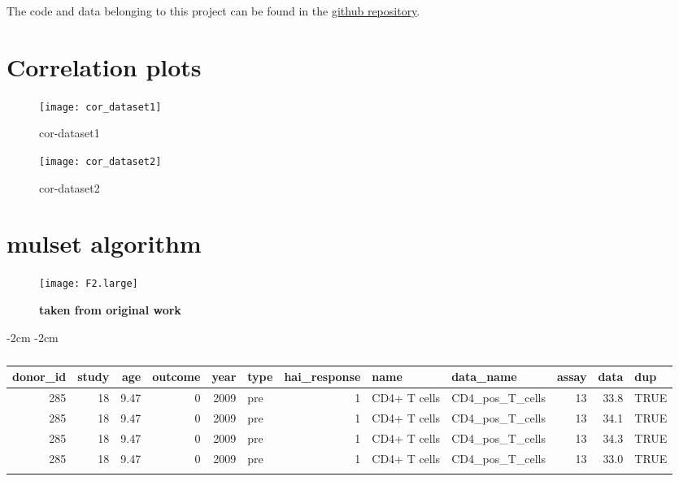The code and data belonging to this project can be found in the \href{}{github repository}.

\printbibliography

\begin{appendices}

    \section{Correlation plots}

\begin{figure}[htpb]
    \centering
    \texttt{[image: cor\_dataset1]}
    \caption{cor-dataset1}
    \label{fig:cor-dataset1}
\end{figure}

\begin{figure}[htpb]
    \centering
    \texttt{[image: cor\_dataset2]}
    \caption{cor-dataset2}
    \label{fig:cor-dataset2}
\end{figure}

    \section{mulset algorithm}

\begin{figure}[htpb]
    \texttt{[image: F2.large]}
    \caption{\textbf{taken from original work}}\label{fig:mulsetAlg}
\end{figure}

\begin{table}[htpb]
\addtolength{\leftskip} {-2cm} %
\addtolength{\rightskip} {-2cm} %
\begin{tabular}{rrrrrlrllrrl}
\toprule{}
donor\_id & study & age & outcome & year & type & hai\_response & name & data\_name & assay & data & dup\\
\midrule{}
285 & 18 & 9.47 & 0 & 2009 & pre & 1 & CD4+ T cells & CD4\_pos\_T\_cells & 13 & 33.8 & TRUE\\
285 & 18 & 9.47 & 0 & 2009 & pre & 1 & CD4+ T cells & CD4\_pos\_T\_cells & 13 & 34.1 & TRUE\\
285 & 18 & 9.47 & 0 & 2009 & pre & 1 & CD4+ T cells & CD4\_pos\_T\_cells & 13 & 34.3 & TRUE\\
285 & 18 & 9.47 & 0 & 2009 & pre & 1 & CD4+ T cells & CD4\_pos\_T\_cells & 13 & 33.0 & TRUE\\
\bottomrule{}
\end{tabular}
    \caption{}\label{tbl:exampleDuplicate}
\end{table}




\end{appendices}

